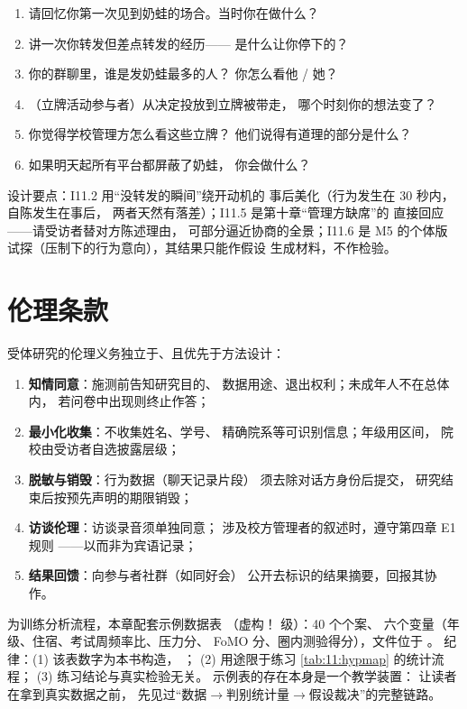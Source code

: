 \begin{enumerate}[label=I11.\arabic*,leftmargin=3.2em,itemsep=0.2em]
  \item 请回忆你第一次见到奶蛙的场合。当时你在做什么？
  \item 讲一次你转发但差点转发的经历——
        是什么让你停下的？
  \item 你的群聊里，谁是发奶蛙最多的人？
        你怎么看他 / 她？
  \item （立牌活动参与者）从决定投放到立牌被带走，
        哪个时刻你的想法变了？
  \item 你觉得学校管理方怎么看这些立牌？
        他们说得有道理的部分是什么？
  \item 如果明天起所有平台都屏蔽了奶蛙，
        你会做什么？
\end{enumerate}

设计要点：I11.2 用“没转发的瞬间”绕开动机的
事后美化（行为发生在 30 秒内，自陈发生在事后，
两者天然有落差）；I11.5 是第十章“管理方缺席”的
直接回应——请受访者替对方陈述理由，
可部分逼近协商的全景；I11.6 是 M5 的个体版
试探（压制下的行为意向），其结果只能作假设
生成材料，不作检验。

\section{伦理条款}\label{sec:11:ethics}

受体研究的伦理义务独立于、且优先于方法设计：

\begin{enumerate}[label=(\arabic*),leftmargin=2.4em]
  \item \textbf{知情同意}：施测前告知研究目的、
        数据用途、退出权利；未成年人不在总体内，
        若问卷中出现则终止作答；
  \item \textbf{最小化收集}：不收集姓名、学号、
        精确院系等可识别信息；年级用区间，
        院校由受访者自选披露层级；
  \item \textbf{脱敏与销毁}：行为数据（聊天记录片段）
        须去除对话方身份后提交，
        研究结束后按预先声明的期限销毁；
  \item \textbf{访谈伦理}：访谈录音须单独同意；
        涉及校方管理者的叙述时，遵守第四章 E1 规则
        ——以而非为宾语记录；
  \item \textbf{结果回馈}：向参与者社群（如同好会）
        公开去标识的结果摘要，回报其协作。
\end{enumerate}

\begin{nlmethod}[示例数据的使用纪律]
  为训练分析流程，本章配套示例数据表
  （虚构！ 级）：40 个个案、
  六个变量（年级、住宿、考试周频率比、压力分、
  FoMO 分、圈内测验得分），文件位于
  。
  纪律：(1) 该表数字为本书构造，
  ；
  (2) 用途限于练习 \ref{tab:11:hypmap} 的统计流程；
  (3) 练习结论与真实检验无关。
  示例表的存在本身是一个教学装置：
  让读者在拿到真实数据之前，
  先见过“数据$\to$判别统计量$\to$假设裁决”的完整链路。
\end{nlmethod}

